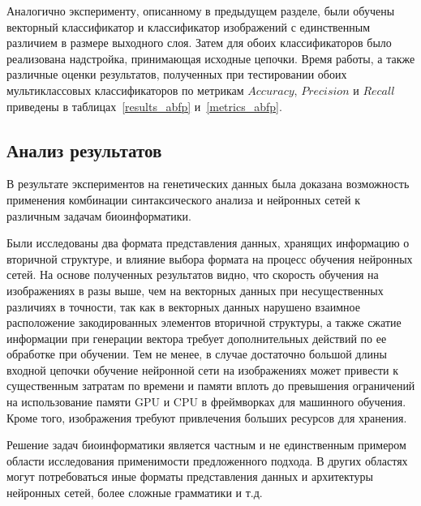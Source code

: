 \documentclass[14pt]{matmex-diploma-custom}
\begin{document}
Аналогично эксперименту, описанному в предыдущем разделе, были обучены векторный классификатор и классификатор изображений с единственным различием в размере выходного слоя. Затем для обоих классификаторов было реализована надстройка, принимающая исходные цепочки. Время работы, а также различные оценки результатов, полученных при тестировании обоих мультиклассовых классификаторов по метрикам $Accuracy$, $Precision$ и $Recall$ приведены в таблицах~\ref{results_abfp} и~\ref{metrics_abfp}.




\subsection{Анализ результатов}
В результате экспериментов на генетических данных была доказана возможность применения комбинации синтаксического анализа и нейронных сетей к различным задачам биоинформатики.

Были исследованы два формата представления данных, хранящих информацию о вторичной структуре, и влияние выбора формата на процесс обучения нейронных сетей. На основе полученных результатов видно, что скорость обучения на изображениях в разы выше, чем на векторных данных при несущественных различиях в точности, так как в векторных данных нарушено взаимное расположение закодированных элементов вторичной структуры, а также сжатие информации при генерации вектора требует дополнительных действий по ее обработке при обучении. Тем не менее, в случае достаточно большой длины входной цепочки обучение нейронной сети на изображениях может привести к существенным затратам по времени и памяти вплоть до превышения ограничений на использование памяти GPU и CPU в фреймворках для машинного обучения. Кроме того, изображения требуют привлечения больших ресурсов для хранения.

Решение задач биоинформатики является частным и не единственным примером области исследования применимости предложенного подхода. В других областях могут потребоваться иные форматы представления данных и архитектуры нейронных сетей, более сложные грамматики и т.д.
\end{document}
